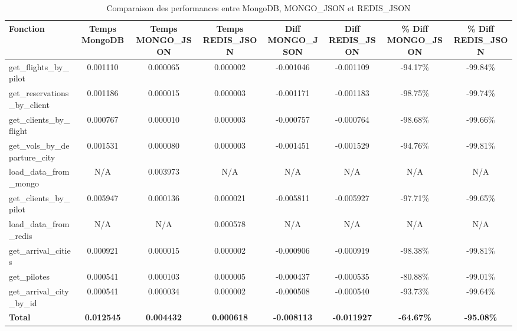 \begin{table}[htbp]
  \centering
  \caption{Comparaison des performances entre MongoDB, MONGO\_JSON et REDIS\_JSON}
  \label{tab:performance1}
  \begin{adjustbox}{width=\textwidth}
  \begin{tabular}{lccccccc}
  \toprule
  \textbf{Fonction} & \textbf{Temps MongoDB} & \textbf{Temps MONGO\_JSON} & \textbf{Temps REDIS\_JSON} & \textbf{Diff MONGO\_JSON} & \textbf{Diff REDIS\_JSON} & \textbf{\% Diff MONGO\_JSON} & \textbf{\% Diff REDIS\_JSON} \\
  \midrule
  get\_flights\_by\_pilot       & 0.001110 & 0.000065 & 0.000002 & -0.001046 & -0.001109 & -94.17\%  & -99.84\%  \\
  get\_reservations\_by\_client & 0.001186 & 0.000015 & 0.000003 & -0.001171 & -0.001183 & -98.75\%  & -99.74\%  \\
  get\_clients\_by\_flight      & 0.000767 & 0.000010 & 0.000003 & -0.000757 & -0.000764 & -98.68\%  & -99.66\%  \\
  get\_vols\_by\_departure\_city & 0.001531 & 0.000080 & 0.000003 & -0.001451 & -0.001529 & -94.76\%  & -99.81\%  \\
  load\_data\_from\_mongo       & N/A      & 0.003973 & N/A       & N/A       & N/A       & N/A       & N/A       \\
  get\_clients\_by\_pilot       & 0.005947 & 0.000136 & 0.000021 & -0.005811 & -0.005927 & -97.71\%  & -99.65\%  \\
  load\_data\_from\_redis       & N/A      & N/A      & 0.000578 & N/A       & N/A       & N/A       & N/A       \\
  get\_arrival\_cities          & 0.000921 & 0.000015 & 0.000002 & -0.000906 & -0.000919 & -98.38\%  & -99.81\%  \\
  get\_pilotes                  & 0.000541 & 0.000103 & 0.000005 & -0.000437 & -0.000535 & -80.88\%  & -99.01\%  \\
  get\_arrival\_city\_by\_id     & 0.000541 & 0.000034 & 0.000002 & -0.000508 & -0.000540 & -93.73\%  & -99.64\%  \\
  \midrule
  \textbf{Total}                & \textbf{0.012545} & \textbf{0.004432} & \textbf{0.000618} & \textbf{-0.008113} & \textbf{-0.011927} & \textbf{-64.67\%} & \textbf{-95.08\%} \\
  \bottomrule
  \end{tabular}
  \end{adjustbox}
\end{table}

